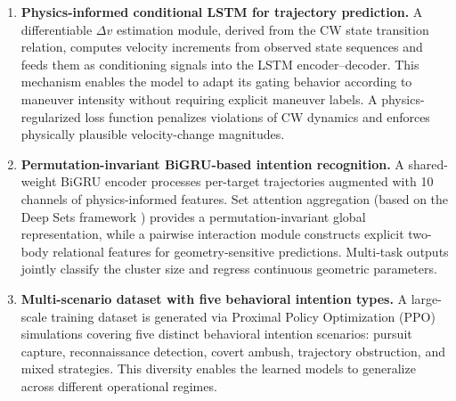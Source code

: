 \documentclass[a4paper,fleqn]{cas-dc}
\begin{document}
\begin{enumerate}
    \item \textbf{Physics-informed conditional LSTM for trajectory prediction.} A differentiable $\Delta v$ estimation module, derived from the CW state transition relation, computes velocity increments from observed state sequences and feeds them as conditioning signals into the LSTM encoder--decoder. This mechanism enables the model to adapt its gating behavior according to maneuver intensity without requiring explicit maneuver labels. A physics-regularized loss function penalizes violations of CW dynamics and enforces physically plausible velocity-change magnitudes.

    \item \textbf{Permutation-invariant BiGRU-based intention recognition.} A shared-weight BiGRU encoder processes per-target trajectories augmented with 10 channels of physics-informed features. Set attention aggregation (based on the Deep Sets framework \cite{zaheer2017deep}) provides a permutation-invariant global representation, while a pairwise interaction module constructs explicit two-body relational features for geometry-sensitive predictions. Multi-task outputs jointly classify the cluster size and regress continuous geometric parameters.

    \item \textbf{Multi-scenario dataset with five behavioral intention types.} A large-scale training dataset is generated via Proximal Policy Optimization (PPO) \cite{schulman2017proximal} simulations covering five distinct behavioral intention scenarios: pursuit capture, reconnaissance detection, covert ambush, trajectory obstruction, and mixed strategies. This diversity enables the learned models to generalize across different operational regimes.
\end{enumerate}
\end{document}
